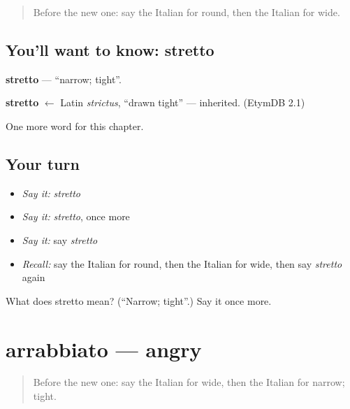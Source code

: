 \label{lesson:IT-C129-stretto}



\begin{quote}
Before the new one: say the Italian for round, then the Italian for wide.
\end{quote}

\subsection*{You'll want to know: stretto}
\textbf{stretto} — \textquotedblleft{}narrow; tight\textquotedblright{}.

\begin{cousinweb}
\textbf{stretto} $\leftarrow$ Latin \emph{strictus}, \textquotedblleft{}drawn tight\textquotedblright{} — inherited. (EtymDB 2.1)
\end{cousinweb}

\begin{grammarlens}[title={What you've built}]
One more word for this chapter.
\end{grammarlens}

\subsection*{Your turn}
\begin{itemize}
\raggedright
  \item \emph{Say it:} \emph{stretto}
  \item \emph{Say it:} \emph{stretto}, once more
  \item \emph{Say it:} say \emph{stretto}
  \item \emph{Recall:} say the Italian for round, then the Italian for wide, then say \emph{stretto} again
\end{itemize}

\begin{tcolorbox}[breakable,colback=teal!4,colframe=teal!35!black,title={Before you move on}]
What does stretto mean? (\textquotedblleft{}Narrow; tight\textquotedblright{}.) Say it once more.
\end{tcolorbox}
\section[arrabbiato]{arrabbiato — angry}

\label{lesson:IT-C129-arrabbiato}



\begin{quote}
Before the new one: say the Italian for wide, then the Italian for narrow; tight.
\end{quote}

